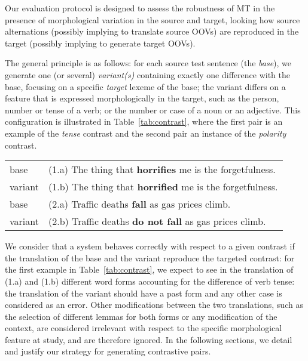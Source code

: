 \documentclass[11pt,letterpaper,final,nohyperref]{article}
\begin{document}
Our evaluation protocol is designed to assess the robustness of MT in the presence of morphological variation in the source and target, looking how source alternations (possibly implying to translate source OOVs) are reproduced in the target (possibly implying to generate target OOVs).

The general principle is as follows: for each source test sentence (the \emph{base}), we generate one (or several) \emph{variant(s)} containing exactly one difference with the base, focusing on a specific \emph{target} lexeme of the base; the variant differs on a feature that is expressed morphologically in the target, such as the person, number or tense of a verb; or the number or case of a noun or an adjective. This configuration is illustrated in Table~\ref{tab:contrast}, where the first pair is an example of the \emph{tense} contrast and the second pair an instance of the \emph{polarity} contrast.

\begin{table*}[t]
  \centering
  \begin{tabular}{ll}
    base & (1.a) The thing that \textbf{horrifies} me is the forgetfulness. \\
    variant & (1.b) The thing that \textbf{horrified} me is the forgetfulness. \\ \hline
    base & (2.a)  Traffic deaths \textbf{fall} as gas prices climb. \\
    variant & (2.b) Traffic deaths \textbf{do not fall} as gas prices climb. \\ \hline
  \end{tabular}
  \caption{Generating minimal contrastive pairs}
  \label{tab:contrast}
\end{table*}

We consider that a system behaves correctly with respect to a 
given contrast if the translation of the base and the variant 
reproduce the targeted contrast: for the first example in 
Table~\ref{tab:contrast}, we expect to see
in the translation of (1.a) and (1.b) different word forms
accounting for the difference of verb tense: the translation
of the variant should have a past form and any other case is
considered as an error. Other modifications between the
two translations, such as the selection of different lemmas
for both forms or any modification of the context, are considered
irrelevant with respect to the specific morphological feature at study,
and are therefore ignored.
In the following sections, we detail and justify our strategy for generating contrastive pairs.
\end{document}
